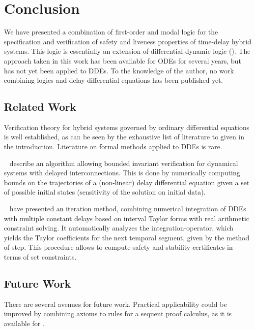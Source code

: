 \chapter{Conclusion}
    \label{ch:conclusion}

    We have presented a combination of first-order and modal logic for the specification and verification of safety and liveness properties of time-delay hybrid systems.
    This logic is essentially an extension of differential dynamic logic (\dL).
    The approach taken in this work has been available for ODEs for several years, but has not yet been applied to DDEs. 
    To the knowledge of the author, no work combining logics and delay differential equations has been published yet.

    \section{Related Work}
        Verification theory for hybrid systems governed by ordinary differential equations is well established, as can be seen by the exhaustive list of literature to \dL given in the introduction.
        Literature on formal methods applied to DDEs is rare.
        
        \citeauthor*{Huang16BoundedVerificationNNDS}~\cite{Huang16BoundedVerificationNNDS} describe an algorithm allowing bounded invariant verification for dynamical systems with delayed interconnections.
        This is done by numerically computing bounds on the trajectories of a (non-linear) delay differential equation given a set of possible initial states (sensitivity of the solution on initial data).
        
        \citeauthor{Zou15AutomaticVerifDDEs}~\cite{Zou15AutomaticVerifDDEs} have presented an iteration method, combining numerical integration of DDEs with multiple constant delays based on interval Taylor forms
        with real arithmetic constraint solving.
        It automatically analyzes the integration-operator, which yields the Taylor coefficients for the next temporal segment, given by the method of step.
        This procedure allows to compute safety and stability certificates in terms of set constraints.

    \section{Future Work}
        There are several avenues for future work. Practical applicability could be improved by combining axioms to rules for a sequent proof calculus, as it is available for \dL.

